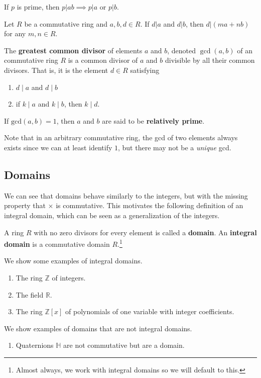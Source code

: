   \begin{lemma}[Euclid]
    If $p$ is prime, then $p|ab \implies p|a$ or $p|b$.  
  \end{lemma}

  \begin{lemma} 
    Let $R$ be a commutative ring and $a, b, d \in R$. If $d|a$ and $d|b$, then $d | (ma + nb)$ for any $m, n \in R$. 
  \end{lemma} 

  \begin{definition}
    The \textbf{greatest common divisor} of elements $a$ and $b$, denoted $\gcd(a, b)$ of an commutative ring $R$ is a common divisor of $a$ and $b$ divisible by all their common divisors. That is, it is the element $d \in R$ satisfying 
    \begin{enumerate}
      \item $d \mid a$ and $d \mid b$ 
      \item if $k \mid a$ and $k \mid b$, then $k \mid d$. 
    \end{enumerate}
    If $\mathrm{gcd}(a, b) = 1$, then $a$ and $b$ are said to be \textbf{relatively prime}. 
  \end{definition} 

  Note that in an arbitrary commutative ring, the gcd of two elements always exists since we can at least identify $1$, but there may not be a \textit{unique} gcd. 

\subsection{Domains}

  We can see that domains behave similarly to the integers, but with the missing property that $\times$ is commutative. This motivates the following definition of an integral domain, which can be seen as a generalization of the integers. 

  \begin{definition}[Domain]
    A ring $R$ with no zero divisors for every element is called a \textbf{domain}. An \textbf{integral domain} is a commutative domain $R$.\footnote{Almost always, we work with integral domains so we will default to this.} 
  \end{definition} 

  \begin{example}
    We show some examples of integral domains. 
    \begin{enumerate}
      \item The ring $\mathbb{Z}$ of integers. 
      \item The field $\mathbb{R}$. 
      \item The ring $\mathbb{Z}[x]$ of polynomials of one variable with integer coefficients. 
    \end{enumerate}
    We show examples of domains that are not integral domains. 
    \begin{enumerate}
      \item Quaternions $\mathbb{H}$ are not commutative but are a domain. 
    \end{enumerate}
  \end{example} 

